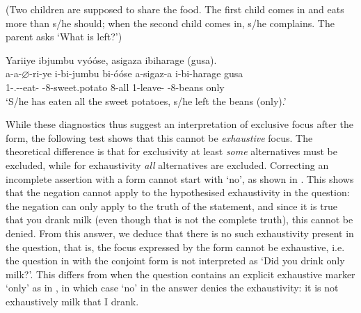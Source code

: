 \documentclass[output=paper]{langscibook}
\begin{document}
\ex
(Two children are supposed to share the food. The first child comes in and eats more than s/he should; when the second child comes in, s/he complains. The parent asks ‘What is left?’)\\
\begin{xlist}
\exi{\CJ}
\label{bkm:Ref76372322}
Yariiye ibjumbu vyóóse, asigaza ibiharage (gusa).\\
\gll
a-a-$\varnothing$-ri-ye  i-bi-jumbu  bi-óóse  a-sigaz-a   i-bi-harage  gusa \\
1\SM-\N.\PST{}-\CJ{}-eat-\PFV{}  \AUG{}-8-sweet.potato  8-all  1\SM{}-leave-\FV{}   \AUG{}-8-beans  only \\
\glt
  ‘S/he has eaten all the sweet potatoes, s/he left the beans (only).’\\

\end{xlist}
\z
\z


While these diagnostics thus suggest an interpretation of exclusive focus after the \CJ{} form, the following test shows that this cannot be \textit{exhaustive} focus. The theoretical difference is that for exclusivity at least \textit{some} alternatives must be excluded, while for exhaustivity \textit{all} alternatives are excluded. Correcting an incomplete assertion with a \CJ{} form cannot start with ‘no’, as shown in . This shows that the negation cannot apply to the hypothesised exhaustivity in the question: the negation can only apply to the truth of the statement, and since it is true that you drank milk (even though that is not the complete truth), this cannot be denied. From this answer, we deduce that there is no such exhaustivity present in the question, that is, the focus expressed by the \CJ{} form cannot be exhaustive, i.e. the question in  with the conjoint form is not interpreted as ‘Did you drink only milk?’. This differs from when the question contains an explicit exhaustive marker ‘only’ as in , in which case ‘no’ in the answer denies the exhaustivity: it is not exhaustively milk that I drank.
\end{document}
